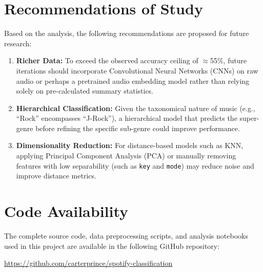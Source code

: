 \documentclass[12pt, a4paper]{article}
\begin{document}
\section{Recommendations of Study}
Based on the analysis, the following recommendations are proposed for future research:

\begin{enumerate}
    \item \textbf{Richer Data:} To exceed the observed accuracy ceiling of $\approx$55\%, future iterations should incorporate Convolutional Neural Networks (CNNs) on raw audio or perhaps a pretrained audio embedding model rather than relying solely on pre-calculated summary statistics.
    \item \textbf{Hierarchical Classification:} Given the taxonomical nature of music (e.g., ``Rock'' encompasses ``J-Rock''), a hierarchical model that predicts the super-genre before refining the specific sub-genre could improve performance.
    \item \textbf{Dimensionality Reduction:} For distance-based models such as KNN, applying Principal Component Analysis (PCA) or manually removing features with low separability (such as \texttt{key} and \texttt{mode}) may reduce noise and improve distance metrics.
\end{enumerate}

\section{Code Availability}
The complete source code, data preprocessing scripts, and analysis notebooks used in this project are available in the following GitHub repository:

\url{https://github.com/carterprince/spotify-classification}
\end{document}
